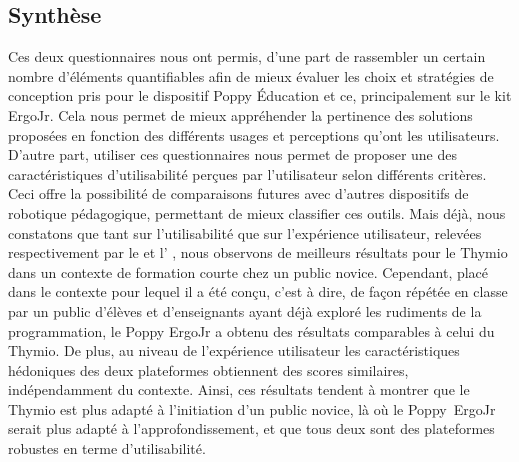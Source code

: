     \subsection{Synthèse}
        Ces deux questionnaires  nous ont permis, d'une part de rassembler un certain nombre d'éléments quantifiables afin de mieux évaluer les choix et stratégies de conception pris pour le dispositif Poppy Éducation et ce, principalement sur le kit ErgoJr.
        Cela nous permet de mieux appréhender la pertinence des solutions proposées en fonction des différents usages et perceptions qu'ont les utilisateurs.
        D'autre part, utiliser ces questionnaires nous permet de proposer une  des caractéristiques d'utilisabilité perçues par l'utilisateur selon différents critères.
        Ceci offre la possibilité de comparaisons futures avec d'autres dispositifs de robotique pédagogique, permettant de mieux classifier ces outils.
        Mais déjà, nous constatons que tant sur l'utilisabilité que sur l'expérience utilisateur, relevées respectivement par le  et l' , nous observons de meilleurs résultats pour le Thymio dans un contexte de formation courte chez un public novice. Cependant, placé dans le contexte pour lequel il a été conçu, c'est à dire, de façon répétée en classe par un public d'élèves et d'enseignants ayant déjà exploré les rudiments de la programmation, le Poppy ErgoJr a obtenu des résultats comparables à celui du Thymio. De plus, au niveau de l'expérience utilisateur les caractéristiques hédoniques des deux plateformes obtiennent des scores similaires, indépendamment du contexte. Ainsi, ces résultats tendent à montrer que le Thymio est plus adapté à l'initiation d'un public novice, là où le Poppy~ErgoJr serait plus adapté à l'approfondissement, et que tous deux sont des plateformes robustes en terme d'utilisabilité.